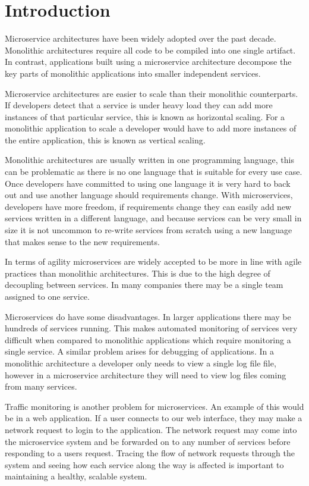 \chapter{Introduction}

Microservice architectures have been widely adopted over the past decade. Monolithic architectures require all code to be compiled into one single artifact. In contrast, applications built using a microservice architecture decompose the key parts of monolithic applications into smaller independent services. 

Microservice architectures are easier to scale than their monolithic counterparts. If developers detect that a service is under heavy load they can add more instances of that particular service, this is known as horizontal scaling. For a monolithic application to scale a developer would have to add more instances of the entire application, this is known as vertical scaling. 

Monolithic architectures are usually written in one programming language, this can be problematic as there is no one language that is suitable for every use case. Once developers have committed to using one language it is very hard to back out and use another language should requirements change. With microservices, developers have more freedom, if requirements change they can easily add new services written in a different language, and because services can be very small in size it is not uncommon to re-write services from scratch using a new language that makes sense to the new requirements.

In terms of agility microservices are widely accepted to be more in line with agile practices than monolithic architectures. This is due to the high degree of decoupling between services. In many companies there may be a single team assigned to one service.

Microservices do have some disadvantages. In larger applications there may be hundreds of services running. This makes automated monitoring of services very difficult when compared to monolithic applications which require monitoring a single service. A similar problem arises for debugging of applications. In a monolithic architecture a developer only needs to view a single log file file, however in a microservice architecture they will need to view log files coming from many services. 

Traffic monitoring is another problem for microservices. An example of this would be in a web application. If a user connects to our web interface, they may make a network request to login to the application. The network request may come into the microservice system and be forwarded on to any number of services before responding to a users request. Tracing the flow of network requests through the system and seeing how each service along the way is affected is important to maintaining a healthy, scalable system. 

